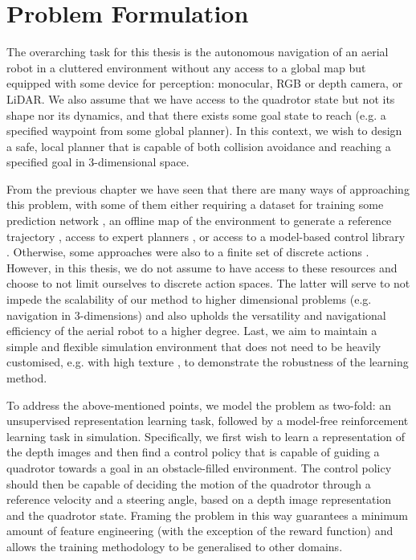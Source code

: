 \chapter{Problem Formulation}
\label{chap:4_problem_formulation}

The overarching task for this thesis is the autonomous navigation of an aerial robot in a cluttered environment without any access to a global map but equipped with some device for perception: monocular, RGB or depth camera, or LiDAR. We also assume that we have access to the quadrotor state but not its shape nor its dynamics, and that there exists some goal state to reach (e.g. a specified waypoint from some global planner). In this context, we wish to design a safe, local planner that is capable of both collision avoidance and reaching a specified goal in 3-dimensional space.

From the previous chapter we have seen that there are many ways of approaching this problem, with some of them either requiring a dataset for training some prediction network \cite{dronet}, an offline map of the environment to generate a reference trajectory \cite{supervised_DeepDroneRacing}, access to expert planners \cite{highSpeedObstacleAvoidanceMonocularVision2005, HighSpeedFlightWild}, or access to a model-based control library \cite{deepCollisionPredictorOracle}. Otherwise, some approaches were also to a finite set of discrete actions \cite{learning_to_fly_by_crashing, highSpeedObstacleAvoidanceMonocularVision2005, TowardsMonocularVisionObstacleAvoidanceDeepRL2017}.
However, in this thesis, we do not assume to have access to these resources and choose to not limit ourselves to discrete action spaces. The latter will serve to not impede the scalability of our method to higher dimensional problems (e.g. navigation in 3-dimensions) and also upholds the versatility and navigational efficiency of the aerial robot to a higher degree. 
Last, we aim to maintain a simple and flexible simulation environment that does not need to be heavily customised, e.g. with high texture \cite{cad2rl, HighSpeedFlightWild}, to demonstrate the robustness of the learning method.

To address the above-mentioned points, we model the problem as two-fold: an unsupervised representation learning task, followed by a model-free reinforcement learning task in simulation. 
Specifically, we first wish to learn a representation of the depth images and then find a control policy that is capable of guiding a quadrotor towards a goal in an obstacle-filled environment. The control policy should then be capable of deciding the motion of the quadrotor through a reference velocity and a steering angle, based on a depth image representation and the quadrotor state. 
Framing the problem in this way guarantees a minimum amount of feature engineering (with the exception of the reward function) and allows the training methodology to be generalised to other domains.

